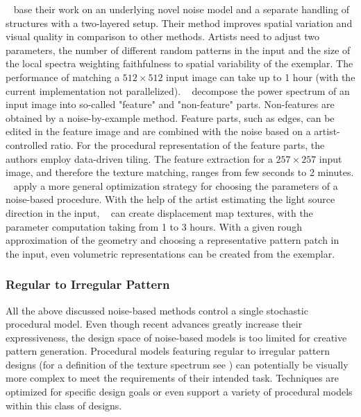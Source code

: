 \citeauthor*{guingo_2017_btm}~\cite{guingo_2017_btm} base their work on an underlying novel noise model and a separate handling of structures with a two-layered setup. Their method improves spatial variation and visual quality in comparison to other methods. Artists need to adjust two parameters, the number of different random patterns in the input and the size of the local spectra weighting faithfulness to spatial variability of the exemplar. The performance of matching a $512\times512$ input image can take up to 1 hour (with the current implementation not parallelized). \citeauthor*{kang_2017_fpt}~\cite{kang_2017_fpt} decompose the power spectrum of an input image into so-called "feature" and "non-feature" parts. Non-features are obtained by a noise-by-example method. Feature parts, such as edges, can be edited in the feature image and are combined with the noise based on a artist-controlled ratio. For the procedural representation of the feature parts, the authors employ data-driven tiling. The feature extraction for a $257\times257$ input image, and therefore the texture matching, ranges from few seconds to 2 minutes. \citeauthor*{gilet_2010_ias}~\cite{gilet_2010_ias} apply a more general optimization strategy for choosing the parameters of a noise-based procedure. With the help of the artist estimating the light source direction in the input, \citeauthor*{gilet_2010_ias}~\cite{gilet_2010_ias} can create displacement map textures, with the parameter computation taking from 1 to 3 hours. With a given rough approximation of the geometry and choosing a representative pattern patch in the input, even volumetric representations can be created from the exemplar.

\subsubsection{Regular to Irregular Pattern}
\label{subsubsec:analysis_distribution_and_repetition_regular}

All the above discussed noise-based methods control a single stochastic procedural model. Even though recent advances greatly increase their expressiveness, the design space of noise-based models is too limited for creative pattern generation. Procedural models featuring regular to irregular pattern designs (for a definition of the texture spectrum see \cite{lin_2006_qeo}) can potentially be visually more complex to meet the requirements of their intended task. Techniques are optimized for specific design goals or even support a variety of procedural models within this class of designs.

